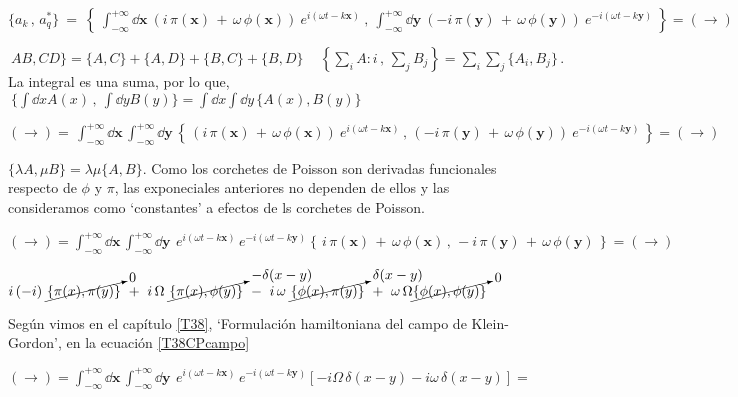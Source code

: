 \vspace{5mm} \begin{small} $\{a_k\, , \, a^*_q\} \ = \ \displaystyle
\left\{ \ \int_{-\infty}^{+\infty} \dd \boldsymbol x \ (i\, \pi(\boldsymbol x) \, + \, \omega\, \phi (\boldsymbol x) ) \  e^{i(\omega t-k \boldsymbol x)} \ , \  \int_{-\infty}^{+\infty} \dd \boldsymbol y \ (-i\, \pi (\boldsymbol y)\, + \, \omega\, \phi (\boldsymbol y) ) \  e^{-i(\omega t-k \boldsymbol y)} \ \right\} = (\to)$\end{small}

\textcolor{gris}{${\ AB,CD\}= \{A,C\} + \{A,D\} + \{B,C\} + \{B,D\}}\, \quad \left\{ \sum_i A:i\, , \, \sum_jB_j \right\} = \sum_i \sum_j \{A_i,B_j\}\, . \ $ La integral es una suma, por lo que, $\ \{\int \dd x A(x)\, , \ \int \dd y B(y)\}=\int \dd x \int \dd y\, \{A(x),B(y)\}$}

$\displaystyle (\to)=\, \int_{-\infty}^{+\infty} \dd \boldsymbol x\, \int_{-\infty}^{+\infty} \dd \boldsymbol y \, \left\{ \,
(i\, \pi(\boldsymbol x) \, + \, \omega\, \phi (\boldsymbol x) ) \  e^{i(\omega t-k \boldsymbol x)} \, , \, (-i\, \pi (\boldsymbol y)\, + \, \omega\, \phi (\boldsymbol y) ) \  e^{-i(\omega t-k \boldsymbol y)}
\, \right\} =(\to)$

\textcolor{gris}{$\{\lambda A, \mu B \}=\lambda \mu \{A,B\}$. Como los corchetes de Poisson son derivadas funcionales respecto de $\phi$ y $\pi$, las exponeciales anteriores no dependen de ellos y las consideramos como `constantes' a efectos de ls corchetes de Poisson.}

$\displaystyle (\to)= 
 \int_{-\infty}^{+\infty} \dd \boldsymbol x\, \int_{-\infty}^{+\infty} \dd \boldsymbol y \, 
 \  e^{i(\omega t-k \boldsymbol x)} \,   e^{-i(\omega t-k \boldsymbol y)} 
 \left\{ \, 
i\, \pi(\boldsymbol x) \, + \, \omega\, \phi (\boldsymbol x)   \, , \, -i\, \pi (\boldsymbol y)\, + \, \omega\, \phi (\boldsymbol y)  
\, \right\} = (\to)$

\begin{small}
\textcolor{gris}{
$\displaystyle  i\, (-i)\ \cancelto{0}{ \{\pi(x),\pi(y)\} }  \ + \ i\, \Omega \  \cancelto{-\delta(x-y)}{ \{\pi(x),\phi(y)\} } \ -  \ i \, \omega \ \cancelto{\delta(x-y)}{\{\phi(x),\pi(y)\}} \ + \ \omega \, \Omega \cancelto{0}{\{\phi(x),\phi(y) \}} $}\end{small}

\textcolor{gris}{Según vimos en el capítulo \ref{T38}, `Formulación hamiltoniana del campo de Klein-Gordon', en la ecuación \ref{T38CPcampo}}

$(\to)= \displaystyle   \int_{-\infty}^{+\infty} \dd \boldsymbol x\, \int_{-\infty}^{+\infty} \dd \boldsymbol y \, 
 \  e^{i(\omega t-k \boldsymbol x)} \,   e^{-i(\omega t-k \boldsymbol y)} 
\left[ -i\Omega \, \delta(x-y)-i\omega \, \delta(x-y)  \right] = $

